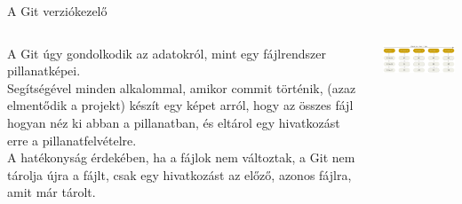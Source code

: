 \documentclass[english, aspectratio=169]{beamer}
\begin{document}
\begin{frame}{A Git verziókezelő}
\begin{columns}
\begin{column}{0.5\textwidth}
A Git úgy gondolkodik az adatokról, mint egy fájlrendszer pillanatképei. 
\\Segítségével minden alkalommal, amikor commit történik, (azaz elmentődik a projekt) készít egy képet arról, hogy az összes fájl hogyan néz ki abban a pillanatban, és eltárol egy hivatkozást erre a pillanatfelvételre.\\
A hatékonyság érdekében, ha a fájlok nem változtak, a Git nem tárolja újra a fájlt, csak egy hivatkozást az előző, azonos fájlra, amit már tárolt.
\end{column}
\begin{column}{0.5\textwidth}
\begin{center}
\includegraphics[width=7cm, keepaspectratio]{images/git_1.png}
\end{center}
\end{column}
\end{columns}
\end{frame}
\end{document}
